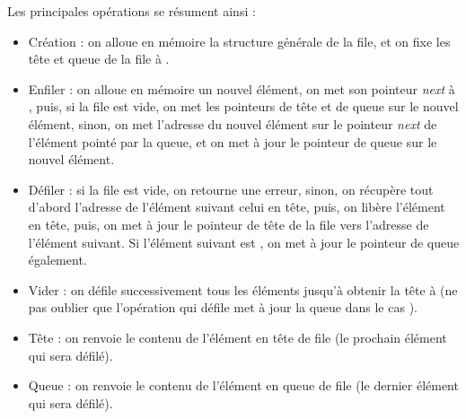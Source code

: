 \smallskip

Les principales opérations se résument ainsi :
\begin{itemize}
\item Création : on alloue en mémoire la structure générale de la file, et on fixe les tête et queue de la file à .
\item Enfiler : on alloue en mémoire un nouvel élément, on met son pointeur \textit{next} à , puis, si la file est vide, on met les pointeurs de tête et de queue sur le nouvel élément, sinon, on met l'adresse du nouvel élément sur le pointeur \textit{next} de l'élément pointé par la queue, et on met à jour le pointeur de queue sur le nouvel élément.
\item Défiler : si la file est vide, on retourne une erreur, sinon, on récupère tout d'abord l'adresse de l'élément suivant celui en tête, puis, on libère l'élément en tête, puis, on met à jour le pointeur de tête de la file vers l'adresse de l'élément suivant. Si l'élément suivant est , on met à jour le pointeur de queue également.
\item Vider : on défile successivement tous les éléments jusqu'à obtenir la tête à  (ne pas oublier que l'opération qui défile met à jour la queue dans le cas ).
\item Tête : on renvoie le contenu de l'élément en tête de file (le prochain élément qui sera défilé).
\item Queue : on renvoie le contenu de l'élément en queue de file (le dernier élément qui sera défilé).
\end{itemize}

\setlength{\parindent}{\defaultparindent}
